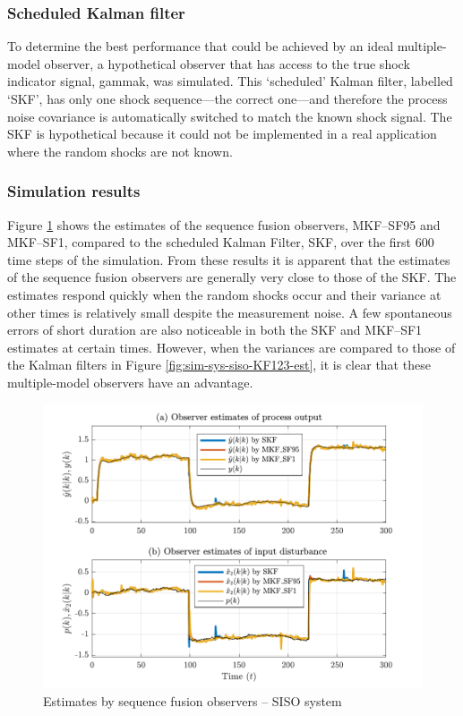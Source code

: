 \subsubsection{Scheduled Kalman filter} \label{sim-obs-lin-1-SKF}

To determine the best performance that could be achieved by an ideal multiple-model observer, a hypothetical observer that has access to the true shock indicator signal, \gls{gammak}, was simulated. This `scheduled' Kalman filter, labelled ‘SKF’, has only one shock sequence---the correct one---and therefore the process noise covariance is automatically switched to match the known shock signal. The SKF is hypothetical because it could not be implemented in a real application where the random shocks are not known.

\subsubsection{Simulation results} \label{sim-obs-lin-1-results}

Figure \ref{fig:rod-obs-sim1-yest-1-SF} shows the estimates of the sequence fusion observers, MKF--SF95 and MKF--SF1, compared to the scheduled Kalman Filter, SKF, over the first 600 time steps of the simulation. From these results it is apparent that the estimates of the sequence fusion observers are generally very close to those of the SKF. The estimates respond quickly when the random shocks occur and their variance at other times is relatively small despite the measurement noise. A few spontaneous errors of short duration are also noticeable in both the SKF and MKF--SF1 estimates at certain times. However, when the variances are compared to those of the Kalman filters in Figure \ref{fig:sim-sys-siso-KF123-est}, it is clear that these multiple-model observers have an advantage.
\begin{figure}[htp]
	\centering
	\includegraphics[width=13cm]{images/rod_obs_sim1_all_seed_y_est1_SF95_SF1.pdf}
	\caption{Estimates by sequence fusion observers – \gls{SISO} system}
	\label{fig:rod-obs-sim1-yest-1-SF}
\end{figure}

